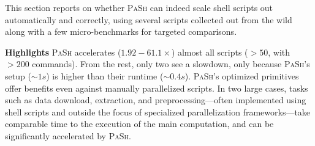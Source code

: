 \documentclass[sigplan, review, screen, anonymous]{acmart}
\newcommand{\heading}[1]{\vspace{4pt}\noindent\textbf{#1}\enspace}
\newcommand{\TODO}[1]{\hl{\textbf{TODO:} #1}\xspace}
\newcommand{\kk}[1]{[{\color{magenta}kk: #1}]}
\newcommand{\sx}[1]{(\S\ref{#1})}
\newcommand{\sys}{{\scshape PaSh}\xspace}
\begin{document}




This section reports on whether \sys can indeed scale shell scripts out automatically and correctly, using several scripts collected out from the wild along with a few micro-benchmarks for targeted comparisons.


\heading{Highlights}
\sys accelerates ($1.92-61.1\times$) almost all scripts ($>50$, with $>200$ commands).
From the rest, only two see a slowdown, only because \sys's setup ($\sim1s$) is higher than their runtime ($\sim0.4s$).
\sys's optimized primitives offer benefits even against manually parallelized scripts. %
In two large cases, tasks such as data download, extraction, and preprocessing---often implemented using shell scripts and outside the focus of specialized parallelization frameworks---take comparable time to the execution of the main computation, and can be significantly accelerated by \sys.
\end{document}
